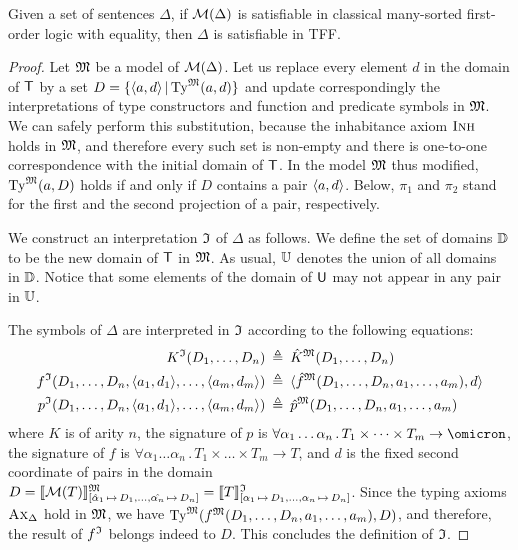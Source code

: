 \begin{theorem} \label{thm:mon_compl}
Given a set of sentences $\Delta$, if $\mathcal{M}(\Delta)$
is satisfiable in classical many-sorted first-order logic
with equality, then $\Delta$ is satisfiable in TFF.
\end{theorem}
\begin{proof}
Let $\mathfrak{M}$ be a model of $\mathcal{M}(\Delta)$. Let us replace every element $d$
in the domain of $\mathsf{T}$ by a set
$D = \{ \langle a,d \rangle \,|\, \mathrm{Ty}^{\mathfrak{M}}(a,d) \}$
and update correspondingly the interpretations of type constructors
and function and predicate symbols in $\mathfrak{M}$.
We can safely perform this substitution, because the inhabitance
axiom $\text{\sc Inh}$ holds in $\mathfrak{M}$, and therefore every such set is non-empty
and there is one-to-one correspondence with the initial domain of $\mathsf{T}$.
In the model $\mathfrak{M}$ thus modified, $\mathrm{Ty}^{\mathfrak{M}}(a,D)$ holds if and only if
$D$ contains a pair $\langle a,d \rangle$.
%
Below, $\pi_1$ and $\pi_2$ stand for the first and the second projection
of a pair, respectively.

We construct an interpretation $\mathfrak{I}$ of $\Delta$ as follows.
We define the set of domains $\mathbb{D}$ to be the new domain
of $\mathsf{T}$ in $\mathfrak{M}$. As usual, $\mathbb{U}$ denotes the union
of all domains in $\mathbb{D}$. Notice that some elements of
the domain of $\mathsf{U}$ may not appear in any pair in $\mathbb{U}$.

The symbols of $\Delta$ are interpreted in $\mathfrak{I}$
according to the following equations:
\begin{align*}
K^{\mathfrak{I}}(D_1,\dots,D_n) &\:\triangleq\: \hat{K}^{\mathfrak{M}}(D_1,\dots,D_n) \\
f^{\mathfrak{I}}(D_1,\dots,D_n,\langle a_1,d_1 \rangle,\dots,\langle a_m,d_m \rangle) &\:\triangleq\:
\langle \hat{f}^{\mathfrak{M}}(D_1,\dots,D_n,a_1,\dots,a_m), d \rangle \\
p^{\mathfrak{I}}(D_1,\dots,D_n,\langle a_1,d_1 \rangle,\dots,\langle a_m,d_m \rangle) &\:\triangleq\:
\hat{p}^{\mathfrak{M}}(D_1,\dots,D_n,a_1,\dots,a_m)
\end{align*}
where
$K$ is of arity $n$,
the signature of $p$ is
$\forall \alpha_1\dots\alpha_n \,.\, T_1 \times \dots \times T_m \to
\omicron$,
the signature of $f$ is
$\forall \alpha_1\dots\alpha_n \,.\, T_1 \times \dots \times T_m \to T$,
and $d$ is the fixed second coordinate of pairs in the domain
$D = \llbracket \mathcal{M}(T) \rrbracket^{\mathfrak{M}}_{[\hat{\alpha}_1\,\mapsto\,D_1,\dots,
\hat{\alpha_n}\,\mapsto\,D_n]} =
\llbracket T \rrbracket^{\mathfrak{I}}_{[\alpha_1\,\mapsto\,D_1,\dots,\alpha_n\,\mapsto\,D_n]}$.
Since the typing axioms $\text{\sc Ax}_{\Delta}$ hold in $\mathfrak{M}$, we have
$\mathrm{Ty}^{\mathfrak{M}}(f^{\mathfrak{M}}(D_1,\dots,D_n,a_1,\dots,a_m), D)$,
and therefore, the result of $f^{\mathfrak{I}}$ belongs indeed to $D$.
This concludes the definition of $\mathfrak{I}$.


\end{proof}
